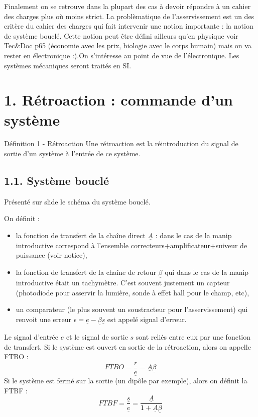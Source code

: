 \documentclass[french, a4paper, 10pt, twocolumn, landscape]{article}
\begin{document}
Finalement on se retrouve dans la plupart des cas à devoir répondre à un cahier des charges plus où moins strict. La problèmatique de l'asservissement est un des critère du cahier des charges qui fait intervenir une notion importante : la notion de système bouclé. Cette notion peut être défini ailleurs qu'en physique voir Tec\&Doc p65 (économie avec les prix, biologie avec le corps humain) mais on va rester en électronique :).On s'intéresse au point de vue de l'électronique. Les systèmes mécaniques seront traités en SI.

\section*{1. Rétroaction : commande d'un système }

\begin{definition}{Définition 1 - Rétroaction}
  Une rétroaction est la réintroduction du signal de sortie d'un système à l'entrée de ce système.

\end{definition}
\subsection*{1.1. Système bouclé}

Présenté sur slide le schéma du système bouclé. 

On définit :
  \begin{itemize}
      \item la fonction de transfert de la chaîne direct $\underline{A}$ : dans le cas de la manip introductive correspond à l'ensemble correcteurs+amplificateur+suiveur de puissance (voir notice),
      \item la fonction de transfert de la chaîne de retour $\underline{\beta}$ qui dans le cas de la manip introductive était un tachymètre. C'est souvent justement un capteur (photodiode pour asservir la lumière, sonde à effet hall pour le champ, etc),
      \item un comparateur (le plus souvent un soustracteur pour l'asservissement) qui renvoit une erreur $\epsilon = \underline{e}-\underline{\beta}\underline{s}$ est appelé signal d'erreur.
  \end{itemize}
  Le signal d'entrée $e$ et le signal de sortie $s$ sont reliés entre eux par une fonction de transfert. Si le système est ouvert en sortie de la rétroaction, alors on appelle FTBO :
  \begin{equation}
      FTBO = \frac{\underline{r}}{\underline{e}} = \underline{A}\underline{\beta}
  \end{equation}
  Si le système est fermé sur la sortie (un dipôle par exemple), alors on définit la FTBF :
  \begin{equation}
      FTBF = \frac{\underline{s}}{\underline{e}} = \frac{\underline{A}}{1+\underline{A}\underline{\beta}}
  \end{equation}
\end{document}
